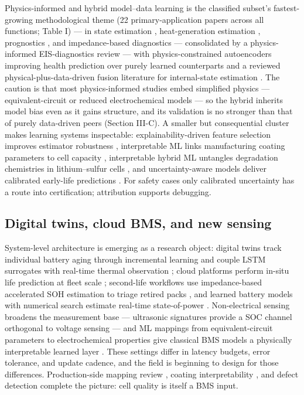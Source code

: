 \documentclass[journal]{IEEEtran}
\begin{document}
Physics-informed and hybrid model--data learning is the classified subset's fastest-growing methodological theme (22 primary-application papers across all functions; Table I) --- in state estimation \cite{r10}\cite{r91}, heat-generation estimation \cite{r9}, prognostics \cite{r60}, and impedance-based diagnostics --- consolidated by a physics-informed EIS-diagnostics review \cite{r21} --- with physics-constrained autoencoders improving health prediction over purely learned counterparts \cite{r92} and a reviewed physical-plus-data-driven fusion literature for internal-state estimation \cite{r93}. The caution is that most physics-informed studies embed simplified physics --- equivalent-circuit or reduced electrochemical models --- so the hybrid inherits model bias even as it gains structure, and its validation is no stronger than that of purely data-driven peers (Section III-C). A smaller but consequential cluster makes learning systems inspectable: explainability-driven feature selection improves estimator robustness \cite{r94}, interpretable ML links manufacturing coating parameters to cell capacity \cite{r95}, interpretable hybrid ML untangles degradation chemistries in lithium--sulfur cells \cite{r96}, and uncertainty-aware models deliver calibrated early-life predictions \cite{r77}. For safety cases only calibrated uncertainty has a route into certification; attribution supports debugging.

\subsection{Digital twins, cloud BMS, and new sensing}

System-level architecture is emerging as a research object: digital twins track individual battery aging through incremental learning \cite{r97} and couple LSTM surrogates with real-time thermal observation \cite{r98}; cloud platforms perform in-situ life prediction at fleet scale \cite{r99}; second-life workflows use impedance-based accelerated SOH estimation to triage retired packs \cite{r100}, and learned battery models with numerical search estimate real-time state-of-power \cite{r101}. Non-electrical sensing broadens the measurement base --- ultrasonic signatures provide a SOC channel orthogonal to voltage sensing \cite{r102} --- and ML mappings from equivalent-circuit parameters to electrochemical properties give classical BMS models a physically interpretable learned layer \cite{r103}. These settings differ in latency budgets, error tolerance, and update cadence, and the field is beginning to design for those differences. Production-side mapping review \cite{r104}, coating interpretability \cite{r95}, and defect detection \cite{r89} complete the picture: cell quality is itself a BMS input.
\end{document}
